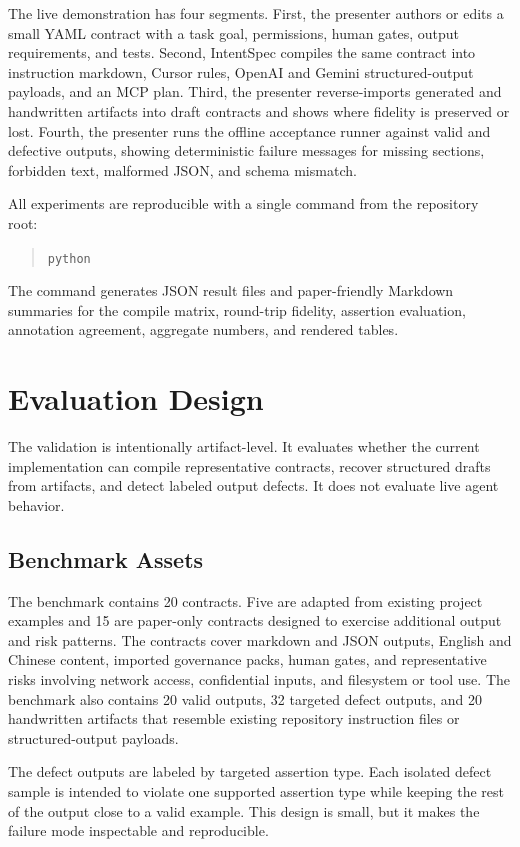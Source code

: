 \documentclass[11pt]{article}
\begin{document}
The live demonstration has four segments. First, the presenter authors or edits a
small YAML contract with a task goal, permissions, human gates, output
requirements, and tests. Second, IntentSpec compiles the same contract into
instruction markdown, Cursor rules, OpenAI and Gemini structured-output payloads,
and an MCP plan. Third, the presenter reverse-imports generated and handwritten
artifacts into draft contracts and shows where fidelity is preserved or lost.
Fourth, the presenter runs the offline acceptance runner against valid and defective
outputs, showing deterministic failure messages for missing sections, forbidden
text, malformed JSON, and schema mismatch.

All experiments are reproducible with a single command from the repository root:
\begin{quote}
\small\texttt{python} 
\end{quote}
The command generates JSON result files and paper-friendly Markdown summaries for
the compile matrix, round-trip fidelity, assertion evaluation, annotation
agreement, aggregate numbers, and rendered tables.

\section{Evaluation Design}

The validation is intentionally artifact-level. It evaluates whether the current
implementation can compile representative contracts, recover structured drafts from
artifacts, and detect labeled output defects. It does not evaluate live agent
behavior.

\subsection{Benchmark Assets}

The benchmark contains 20 contracts. Five are adapted from existing project examples
and 15 are paper-only contracts designed to exercise additional output and risk
patterns. The contracts cover markdown and JSON outputs, English and Chinese
content, imported governance packs, human gates, and representative risks involving
network access, confidential inputs, and filesystem or tool use. The benchmark also
contains 20 valid outputs, 32 targeted defect outputs, and 20 handwritten artifacts
that resemble existing repository instruction files or structured-output payloads.

The defect outputs are labeled by targeted assertion type. Each isolated defect
sample is intended to violate one supported assertion type while keeping the rest of
the output close to a valid example. This design is small, but it makes the failure
mode inspectable and reproducible.
\end{document}
